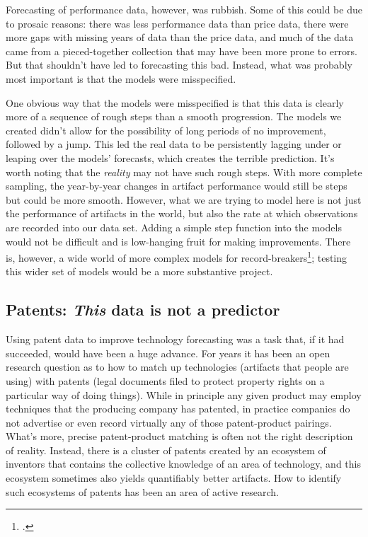 \documentclass{article}
\begin{document}
Forecasting of performance data, however, was rubbish. Some of this could be due to prosaic reasons: there was less performance data than price data, there were more gaps with missing years of data than the price data, and much of the data came from a pieced-together collection that may have been more prone to errors. But that shouldn't have led to forecasting this bad. Instead, what was probably most important is that the models were misspecified. 

One obvious way that the models were misspecified is that this data is clearly more of a sequence of rough steps than a smooth progression. The models we created didn't allow for the possibility of long periods of no improvement, followed by a jump. This led the real data to be persistently lagging under or leaping over the models' forecasts, which creates the terrible prediction. It's worth noting that the \textit{reality} may not have such rough steps. With more complete sampling, the year-by-year changes in artifact performance would still be steps but could be more smooth. However, what we are trying to model here is not just the performance of artifacts in the world, but also the rate at which observations are recorded into our data set. Adding a simple step function into the models would not be difficult and is low-hanging fruit for making improvements. There is, however, a wide world of more complex models for record-breakers\footcite{Berdahl2017}; testing this wider set of models would be a more substantive project.

\subsection{Patents: \textit{This} data is not a predictor}
Using patent data to improve technology forecasting was a task that, if it had succeeded, would have been a huge advance. For years it has been an open research question as to how to match up technologies (artifacts that people are using) with patents (legal documents filed to protect property rights on a particular way of doing things). While in principle any given product may employ techniques that the producing company has patented, in practice companies do not advertise or even record virtually any of those patent-product pairings. What's more, precise patent-product matching is often not the right description of reality. Instead, there is a cluster of patents created by an ecosystem of inventors that contains the collective knowledge of an area of technology, and this ecosystem sometimes also yields quantifiably better artifacts. How to identify such ecosystems of patents has been an area of active research. 
\end{document}
